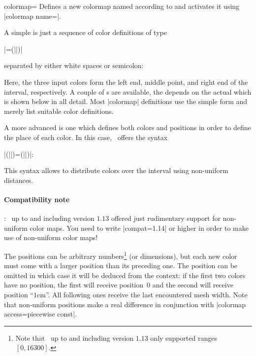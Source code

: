 \begin{pgfplotskey}{colormap=}
	Defines a new colormap named  according to  and activates it using |colormap name=|.
	
	A simple  is just a sequence of color definitions of type

	|=(||)|

	separated by either white spaces or semicolon:

\begin{codeexample}
\end{codeexample}

	Here, the three input colors form the left end, middle point, and right end of the interval, respectively. A couple of s are available, the  depends on the actual  which is shown below in all detail. Most |colormap| definitions use the simple form and merely list suitable color definitions.

	A more advanced  is one which defines both colors and positions in order to define the place of each color. In this case, \PGFPlots\ offers the syntax

	|(||)=(||)|:

\begin{codeexample}
\end{codeexample}
	
	This syntax allows to distribute colors over the interval using non-uniform distances. 
	
	\paragraph{Compatibility note}: \PGFPlots\ up to and including version $1.13$ offered just rudimentary support for non-uniform color maps. You need to write |compat=1.14| or higher in order to make use of non-uniform color maps!
	
	The positions can be arbitrary numbers\footnote{Note that \PGFPlots\ up to and including version $1.13$ only supported ranges $[0,16300]$.} (or dimensions), but each new color must come with a larger position than its preceding one. The position can be omitted in which case it will be deduced from the context: if the first two colors have no position, the first will receive position~$0$ and the second will receive position ``$1\text{cm}$''. All following ones receive the last encountered mesh width. Note that non-uniform positions make a real difference in conjunction with |colormap access=piecewise const|.


\end{pgfplotskey}
